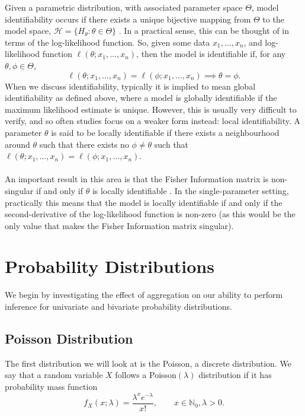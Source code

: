 \documentclass[11pt,a4,twosided,singlespacing,titlepagenumber=on,numbers=endperiod]{scrreprt}
\numberwithin{equation}{chapter} %
\theoremstyle{remark}
\begin{document}
Given a parametric distribution, with associated parameter space $\Theta$, model identifiability occurs if there exists a unique bijective mapping from $\Theta$ to the model space, $\mathcal{H} = \{ H_\theta: \theta \in \Theta \}$ \cite{rothenburg_1971}. In a practical sense, this can be thought of in terms of the log-likelihood function. So, given some data $x_1,\dots,x_n$, and log-likelihood function $\ell(\theta; x_1, \dots, x_n)$, then the model is identifiable if, for any $\theta, \phi \in \Theta$,
\begin{equation*}
	\ell(\theta; x_1, \dots, x_n) = \ell(\phi; x_1, \dots, x_n) \implies \theta = \phi.
\end{equation*}
When we discuss identifiability, typically it is implied to mean global identifiability as defined above, where a model is globally identifiable if the maximum likelihood estimate is unique. However, this is usually very difficult to verify, and so often studies focus on a weaker form instead: local identifiability.
A parameter $\theta$ is said to be locally identifiable if there exists a neighbourhood around $\theta$ such that there exists no $\phi \neq \theta$ such that $\ell(\theta; x_1,\dots,x_n) = \ell(\phi; x_1,\dots,x_n)$. \\\\
An important result in this area is that the Fisher Information matrix is non-singular if and only if $\theta$ is locally identifiable \cite{rothenburg_1971}. In the single-parameter setting, practically this means that the model is locally identifiable if and only if the second-derivative of the log-likelihood function is non-zero (as this would be the only value that makes the Fisher Information matrix singular).


\chapter{Probability Distributions}

We begin by investigating the effect of aggregation on our ability to perform inference for univariate and bivariate probability distributions.

\section{Poisson Distribution}

The first distribution we will look at is the Poisson, a discrete distribution. We say that a random variable $X$ follows a Poisson$(\lambda)$ distribution if it has probability mass function
\begin{equation*}
	f_X(x ; \lambda) = \frac{\lambda^x e^{-\lambda}}{x!}, \quad \quad x \in \mathbb{N}_0, \lambda > 0.
\end{equation*}
\end{document}

